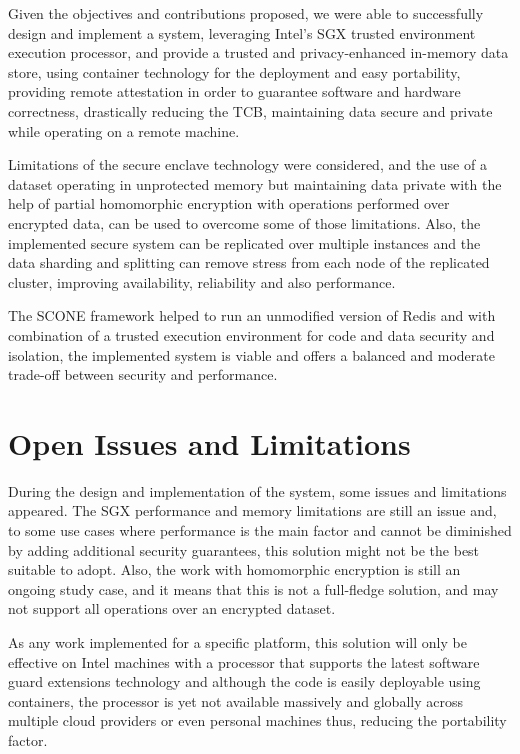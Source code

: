 Given the objectives and contributions proposed, we were able to successfully design and implement a system, leveraging Intel's \gls{SGX} trusted environment execution processor, and provide a trusted and privacy-enhanced in-memory data store, using container technology for the deployment and easy portability, providing remote attestation in order to guarantee software and hardware correctness, drastically reducing the \gls{TCB}, maintaining data secure and private while operating on a remote machine.

Limitations of the secure enclave technology were considered, and the use of a dataset operating in unprotected memory but maintaining data private with the help of partial homomorphic encryption with operations performed over encrypted data, can be used to overcome some of those limitations. Also, the implemented secure system can be replicated over multiple instances and the data sharding and splitting can remove stress from each node of the replicated cluster, improving availability, reliability and also performance.

The SCONE framework helped to run an unmodified version of Redis and with combination of a trusted execution environment for code and data security and isolation, the implemented system is viable and offers a balanced and moderate trade-off between security and performance.

\section{Open Issues and Limitations}
\label{sec:open_issues_and_limitations}

During the design and implementation of the system, some issues and limitations appeared. The \gls{SGX} performance and memory limitations are still an issue and, to some use cases where performance is the main factor and cannot be diminished by adding additional security guarantees, this solution might not be the best suitable to adopt. Also, the work with homomorphic encryption is still an ongoing study case, and it means that this is not a full-fledge solution, and may not support all operations over an encrypted dataset.

As any work implemented for a specific platform, this solution will only be effective on Intel machines with a processor that supports the latest software guard extensions technology and although the code is easily deployable using containers, the processor is yet not available massively and globally across multiple cloud providers or even personal machines thus, reducing the portability factor. 


